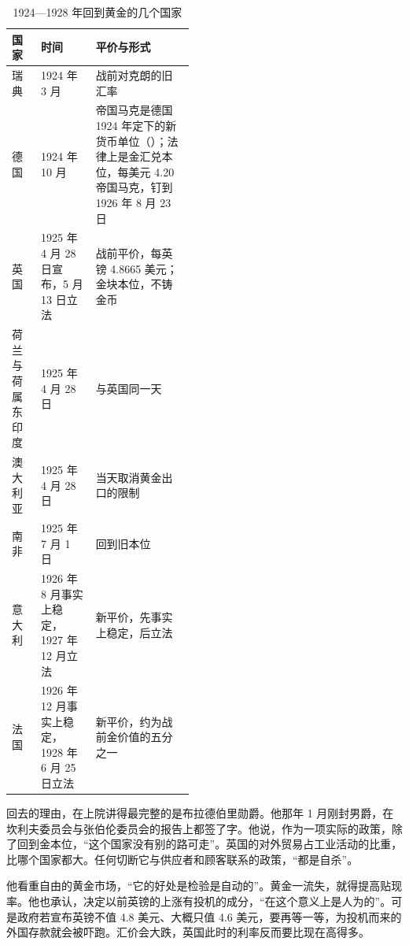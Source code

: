 \begin{table}[!tb]\centering\small
\caption{1924—1928 年回到黄金的几个国家}\label{tab:interwar-returns}
\begin{tabularx}{\linewidth}{@{}p{0.16\linewidth}p{0.30\linewidth}Y@{}}
\toprule
国家 & 时间 & 平价与形式 \\\midrule
瑞典 & 1924 年 3 月 & 战前对克朗的旧汇率 \\
德国 & 1924 年 10 月 & 帝国马克是德国 1924 年定下的新货币单位（）；法律上是金汇兑本位，每美元 4.20 帝国马克，钉到 1926 年 8 月 23 日 \\
英国 & 1925 年 4 月 28 日宣布，5 月 13 日立法 & 战前平价，每英镑 4.8665 美元；金块本位，不铸金币 \\
荷兰与荷属东印度 & 1925 年 4 月 28 日 & 与英国同一天 \\
澳大利亚 & 1925 年 4 月 28 日 & 当天取消黄金出口的限制 \\
南非 & 1925 年 7 月 1 日 & 回到旧本位 \\
意大利 & 1926 年 8 月事实上稳定，1927 年 12 月立法 & 新平价，先事实上稳定，后立法 \\
法国 & 1926 年 12 月事实上稳定，1928 年 6 月 25 日立法 & 新平价，约为战前金价值的五分之一 \\
\bottomrule
\end{tabularx}
\end{table}

回去的理由，在上院讲得最完整的是布拉德伯里勋爵。他那年 1 月刚封男爵，在坎利夫委员会与张伯伦委员会的报告上都签了字\cite{hansardpeople27,hansardlords1925}。他说，作为一项实际的政策，除了回到金本位，“这个国家没有别的路可走”\cite{hansardlords1925}。英国的对外贸易占工业活动的比重，比哪个国家都大。任何切断它与供应者和顾客联系的政策，“都是自杀”\cite{hansardlords1925}。

他看重自由的黄金市场，“它的好处是检验是自动的”。黄金一流失，就得提高贴现率\cite{hansardlords1925}。他也承认，决定以前英镑的上涨有投机的成分，“在这个意义上是人为的”\cite{hansardlords1925}。可是政府若宣布英镑不值 4.8 美元、大概只值 4.6 美元，要再等一等，为投机而来的外国存款就会被吓跑。汇价会大跌，英国此时的利率反而要比现在高得多\cite{hansardlords1925}。

